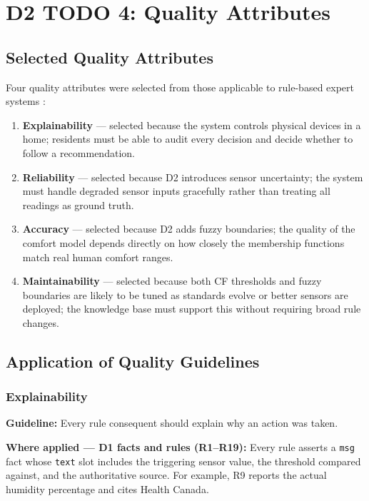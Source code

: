 \documentclass{article}
\begin{document}

\section{D2 TODO 4: Quality Attributes}

\subsection{Selected Quality Attributes}

Four quality attributes were selected from those applicable to rule-based expert systems \cite{giarratano_riley}:

\begin{enumerate}
    \item \textbf{Explainability} — selected because the system controls physical devices in a home; residents must be able to audit every decision and decide whether to follow a recommendation.
    \item \textbf{Reliability} — selected because D2 introduces sensor uncertainty; the system must handle degraded sensor inputs gracefully rather than treating all readings as ground truth.
    \item \textbf{Accuracy} — selected because D2 adds fuzzy boundaries; the quality of the comfort model depends directly on how closely the membership functions match real human comfort ranges.
    \item \textbf{Maintainability} — selected because both CF thresholds and fuzzy boundaries are likely to be tuned as standards evolve or better sensors are deployed; the knowledge base must support this without requiring broad rule changes.
\end{enumerate}

\subsection{Application of Quality Guidelines}

\subsubsection{Explainability}

\textbf{Guideline:} Every rule consequent should explain why an action was taken.

\textbf{Where applied — D1 facts and rules (R1–R19):} Every rule asserts a \texttt{msg} fact whose \texttt{text} slot includes the triggering sensor value, the threshold compared against, and the authoritative source. For example, R9 reports the actual humidity percentage and cites Health Canada.
\end{document}
